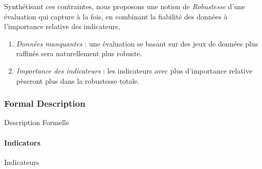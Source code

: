 {Synthétisant ces contraintes, nous proposons une notion de \emph{Robustesse} d'une évaluation qui capture à la fois, en combinant la fiabilité des données à l'importance relative des indicateurs,


\begin{enumerate}
\item \emph{Données manquantes} : une évaluation se basant sur des jeux de données plus raffinés sera naturellement plus robuste.
\item \emph{Importance des indicateurs} : les indicateurs avec plus d'importance relative pèseront plus dans la robustesse totale.
\end{enumerate}
}




\subsubsection{Formal Description}{Description Formelle}


\paragraph{Indicators}{Indicateurs}


